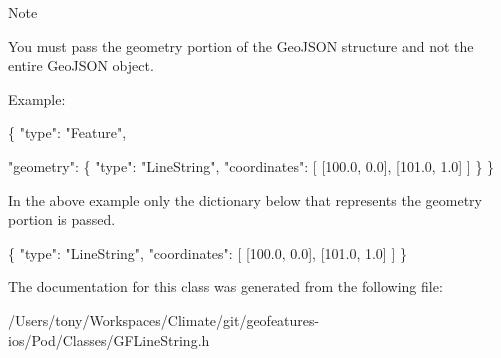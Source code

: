 \begin{DoxyNote}{Note}


You must pass the geometry portion of the Geo\+J\+S\+O\+N structure and not the entire Geo\+J\+S\+O\+N object.

Example\+:


\begin{DoxyCode}
\{
      \textcolor{stringliteral}{"type"}: \textcolor{stringliteral}{"Feature"},

      \textcolor{stringliteral}{"geometry"}: \{ \textcolor{stringliteral}{"type"}: \textcolor{stringliteral}{"LineString"},
                    \textcolor{stringliteral}{"coordinates"}: [ [100.0, 0.0], [101.0, 1.0] ]
                  \}
 \}
\end{DoxyCode}


In the above example only the dictionary below that represents the geometry portion is passed.


\begin{DoxyCode}
\{
      \textcolor{stringliteral}{"type"}: \textcolor{stringliteral}{"LineString"},
      \textcolor{stringliteral}{"coordinates"}: [ [100.0, 0.0], [101.0, 1.0] ]
\}
\end{DoxyCode}
 
\end{DoxyNote}


The documentation for this class was generated from the following file\+:\begin{DoxyCompactItemize}
\item 
/\+Users/tony/\+Workspaces/\+Climate/git/geofeatures-\/ios/\+Pod/\+Classes/G\+F\+Line\+String.\+h\end{DoxyCompactItemize}
